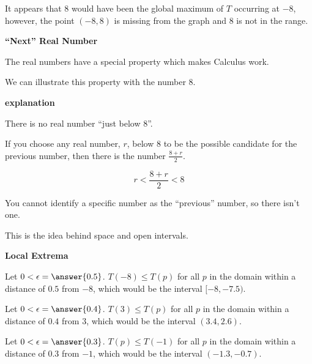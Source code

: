 \documentclass{ximera}
\begin{document}
It appears that $8$ would have been the global maximum of $T$ occurring at $-8$, however, the point $(-8, 8)$ is missing from the graph and $8$ is not in the range.  



\begin{idea}  \textbf{\textcolor{blue!55!black}{``Next'' Real Number}}


The real numbers have a special property which makes Calculus work. 

We can illustrate this property with the number $8$. 

\textbf{\textcolor{red!75!green}{explanation}} 

There is no real number ``just below $8$''.  


If you choose any real number, $r$, below $8$ to be the possible candidate for the previous number, then there is the number $\frac{8+r}{2}$. 

\[  
r < \frac{8+r}{2} < 8
\]  

You cannot identify a specific number as the ``previous'' number, so there isn't one. 

This is the idea behind space and open intervals.




\end{idea}



\begin{explanation} \textbf{\textcolor{red!75!green}{Local Extrema}} 



Let $0 < \epsilon = \answer{0.5}$.  $T(-8) \leq T(p)$ for all $p$ in the domain within a distance of $0.5$ from $-8$, which would be the interval $[-8, -7.5)$.

Let $0 < \epsilon = \answer{0.4}$.  $T(3) \leq T(p)$ for all $p$ in the domain within a distance of $0.4$ from $3$, which would be the interval $(3.4, 2.6)$.

Let $0 < \epsilon = \answer{0.3}$.  $T(p) \leq T(-1)$ for all $p$ in the domain within a distance of $0.3$ from $-1$, which would be the interval $(-1.3, -0.7)$.

\end{explanation}
\end{document}
